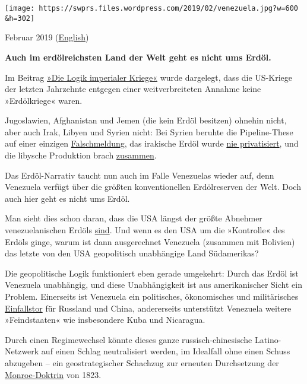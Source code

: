 \texttt{[image: https://swprs.files.wordpress.com/2019/02/venezuela.jpg?w=600\\\&h=302]}

Februar 2019
(\href{https://swprs.org/venezuela-its-not-about-the-oil/}{English})

\textbf{Auch im erdölreichsten Land der Welt geht es nicht ums Erdöl.}

Im Beitrag \href{https://swprs.org/logik-imperialer-kriege/}{»Die Logik
imperialer Kriege«} wurde dargelegt, dass die US-Kriege der letzten
Jahrzehnte entgegen einer weitverbreiteten Annahme keine »Erdölkriege«
waren.

Jugoslawien, Afghanistan und Jemen (die kein Erdöl besitzen) ohnehin
nicht, aber auch Irak, Libyen und Syrien nicht: Bei Syrien beruhte die
Pipeline-These auf einer einzigen
\href{https://truthout.org/articles/the-war-against-the-assad-regime-is-not-a-pipeline-war/}{Falschmeldung},
das irakische Erdöl wurde
\href{https://theconversation.com/iraq-what-happened-to-the-oil-after-the-war-62188}{nie
privatisiert}, und die libysche Produktion brach
\href{http://www.businessinsider.com/r-how-unstable-is-libyas-oil-production-2018-3}{zusammen}.

Das Erdöl-Narrativ taucht nun auch im Falle Venezuelas wieder auf, denn
Venezuela verfügt über die größten konventionellen Erdölreserven der
Welt. Doch auch hier geht es nicht ums Erdöl.

Man sieht dies schon daran, dass die USA längst der größte Abnehmer
venezuelanischen Erdöls
\href{https://www.eia.gov/todayinenergy/detail.php?id=9651}{sind}. Und
wenn es den USA um die »Kontrolle« des Erdöls ginge, warum ist dann
ausgerechnet Venezuela (zusammen mit Bolivien) das letzte von den USA
geopolitisch unabhängige Land Südamerikas?

Die geopolitische Logik funktioniert eben gerade umgekehrt: Durch das
Erdöl ist Venezuela unabhängig, und diese Unabhängigkeit ist aus
amerikanischer Sicht ein Problem. Einerseits ist Venezuela ein
politisches, ökonomisches und militärisches
\href{https://www.heise.de/tp/features/Schlagabtausch-ueber-russische-Atombomber-in-Venezuela-4249160.html}{Einfallstor}
für Russland und China, andererseits unterstützt Venezuela weitere
»Feindstaaten« wie insbesondere Kuba und Nicaragua.

Durch einen Regimewechsel könnte dieses ganze russisch-chinesische
Latino-Netzwerk auf einen Schlag neutralisiert werden, im Idealfall ohne
einen Schuss abzugeben -- ein geostrategischer Schachzug zur erneuten
Durchsetzung der
\href{https://de.wikipedia.org/wiki/Monroe-Doktrin}{Monroe-Doktrin} von
1823.

